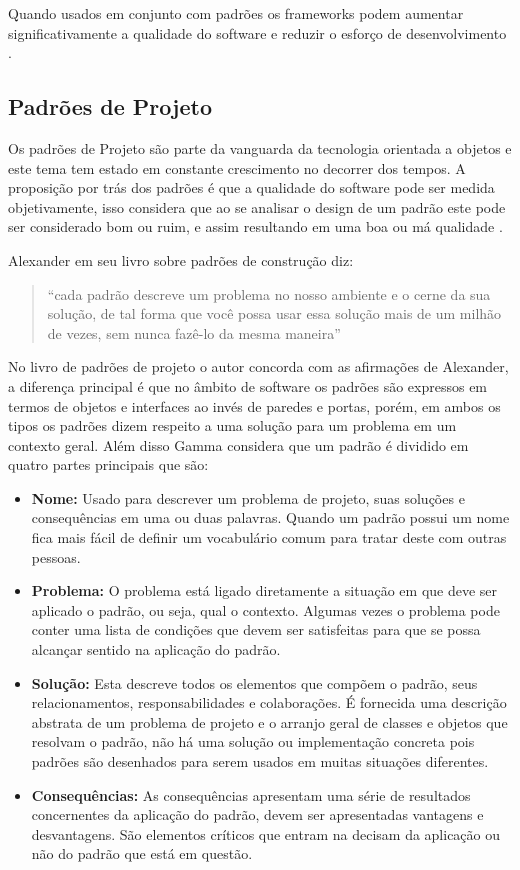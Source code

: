 Quando usados em conjunto com padrões os frameworks podem aumentar significativamente a qualidade do software e reduzir o esforço de desenvolvimento \cite{Fayad:Schimidt:1997}.

\subsection{Padrões de Projeto}

Os padrões de Projeto são parte da vanguarda da tecnologia orientada a objetos e este tema tem estado em constante crescimento no decorrer dos tempos. A proposição por trás dos padrões é que a qualidade do software pode ser medida objetivamente, isso considera que ao se analisar o design de um padrão este pode ser considerado bom ou ruim, e assim resultando em uma boa ou má qualidade \cite{Shalloway:Trott:2004}.

Alexander em seu livro \cite{Alexander:1979} sobre padrões de construção diz:

\begin{quote}
	``cada padrão descreve um problema no nosso
ambiente e o cerne da sua solução, de tal forma que você possa usar essa solução mais
de um milhão de vezes, sem nunca fazê-lo da mesma maneira''
\end{quote}

No livro de padrões de projeto \cite{Gamma:Helm:Johnson:Vlissides:1995} o autor concorda com as afirmações de Alexander, a diferença principal é que no âmbito de software os padrões são expressos em termos de objetos e interfaces ao invés de paredes e portas, porém, em ambos os tipos os padrões dizem respeito a uma solução para um problema em um contexto geral. Além disso Gamma considera que um padrão é dividido em quatro partes principais que são:

\begin{itemize}
	\item \textbf{Nome:} Usado para descrever um problema de projeto, suas soluções e consequências em uma ou duas palavras. Quando um padrão possui um nome fica mais fácil de definir um vocabulário comum para tratar deste com outras pessoas.
	\item \textbf{Problema:} O problema está ligado diretamente a situação em que deve ser aplicado o padrão, ou seja, qual o contexto. Algumas vezes o problema pode conter uma lista de condições que devem ser satisfeitas para que se possa alcançar sentido na aplicação do padrão.
	\item \textbf{Solução:} Esta descreve todos os elementos que compõem o padrão, seus relacionamentos, responsabilidades e colaborações. É fornecida uma descrição abstrata de um problema de projeto e o arranjo geral de classes e objetos que resolvam o padrão, não há uma solução ou implementação concreta pois padrões são desenhados para serem usados em muitas situações diferentes.
	\item \textbf{Consequências:} As consequências apresentam uma série de resultados concernentes da aplicação do padrão, devem ser apresentadas vantagens e desvantagens. São elementos críticos que entram na decisam da aplicação ou não do padrão que está em questão.
\end{itemize}

